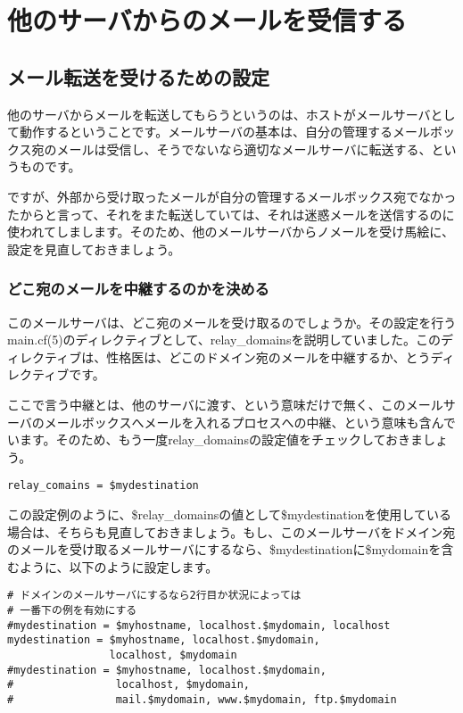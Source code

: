 \chapter{他のサーバからのメールを受信する}

\section{メール転送を受けるための設定}

他のサーバからメールを転送してもらうというのは、ホストがメールサーバとして動作するということです。メールサーバの基本は、自分の管理するメールボックス宛のメールは受信し、そうでないなら適切なメールサーバに転送する、というものです。

ですが、外部から受け取ったメールが自分の管理するメールボックス宛でなかったからと言って、それをまた転送していては、それは迷惑メールを送信するのに使われてしまします。そのため、他のメールサーバからノメールを受け馬絵に、設定を見直しておきましょう。

\subsection{どこ宛のメールを中継するのかを決める}
このメールサーバは、どこ宛のメールを受け取るのでしょうか。その設定を行うmain.cf(5)のディレクティブとして、relay\_domainsを説明していました。このディレクティブは、性格医は、どこのドメイン宛のメールを中継するか、とうディレクティブです。

ここで言う中継とは、他のサーバに渡す、という意味だけで無く、このメールサーバのメールボックスへメールを入れるプロセスへの中継、という意味も含んでいます。そのため、もう一度relay\_domainsの設定値をチェックしておきましょう。

\begin{lstlisting}[basicstyle=\ttfamily\footnotesize, frame=single]
relay_comains = $mydestination
\end{lstlisting}

この設定例のように、\$relay\_domainsの値として\$mydestinationを使用している場合は、そちらも見直しておきましょう。もし、このメールサーバをドメイン宛のメールを受け取るメールサーバにするなら、\$mydestinationに\$mydomainを含むように、以下のように設定します。

\begin{lstlisting}[basicstyle=\ttfamily\footnotesize, frame=single]
# ドメインのメールサーバにするなら2行目か状況によっては
# 一番下の例を有効にする
#mydestination = $myhostname, localhost.$mydomain, localhost
mydestination = $myhostname, localhost.$mydomain,
                localhost, $mydomain
#mydestination = $myhostname, localhost.$mydomain, 
#                localhost, $mydomain,
#                mail.$mydomain, www.$mydomain, ftp.$mydomain
\end{lstlisting}

